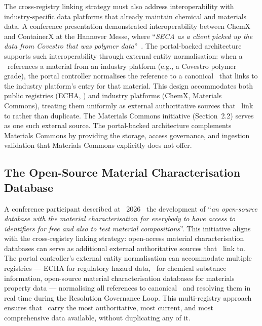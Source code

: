 The cross-registry linking strategy must also address interoperability with
industry-specific data platforms that already maintain chemical and materials
data. A conference presentation demonstrated interoperability between ChemX and
ContainerX at the Hannover Messe, where ``\textit{SECA as a client picked up the
data from Covestro that was polymer data}''~\cite{dpp4eu2026_day2}. The
portal-backed architecture supports such interoperability through external
entity normalisation: when a \DPP\ references a material from an industry
platform (e.g., a Covestro polymer grade), the portal controller normalises the
reference to a canonical \IRI\ that links to the industry platform's entry for
that material. This design accommodates both public registries (ECHA, \PubChem)
and industry platforms (ChemX, Materials Commons), treating them uniformly as
external authoritative sources that \DPPs\ link to rather than duplicate. The
Materials Commons initiative (Section~2.2) serves as one such external source.
The portal-backed architecture complements Materials Commons by providing the
storage, access governance, and ingestion validation that Materials Commons
explicitly does not offer.

\subsection{The Open-Source Material Characterisation Database}

A conference participant described at \DPPforEU~2026~\cite{dpp4eu2026_day1} the
development of ``\textit{an open-source database with the material
characterisation for everybody to have access to identifiers for free and also
to test material compositions}''. This initiative aligns with the cross-registry
linking strategy: open-access material characterisation databases can serve as
additional external authoritative sources that \DPPs\ link to. The portal
controller's external entity normalisation can accommodate multiple registries
--- ECHA for regulatory hazard data, \PubChem\ for chemical substance
information, open-source material characterisation databases for materials
property data --- normalising all references to canonical \IRIs\ and resolving
them in real time during the Resolution Governance Loop. This multi-registry
approach ensures that \DPPs\ carry the most authoritative, most current, and
most comprehensive data available, without duplicating any of it.
